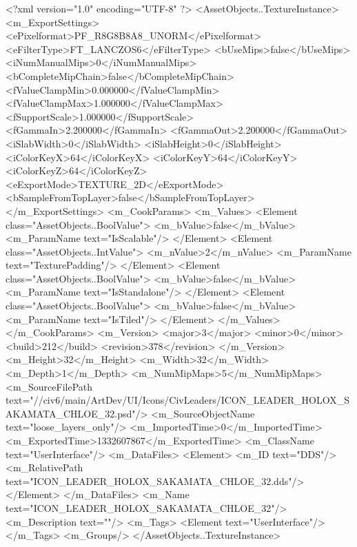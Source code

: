 <?xml version="1.0" encoding="UTF-8" ?>
<AssetObjects..TextureInstance>
	<m_ExportSettings>
		<ePixelformat>PF_R8G8B8A8_UNORM</ePixelformat>
		<eFilterType>FT_LANCZOS6</eFilterType>
		<bUseMips>false</bUseMips>
		<iNumManualMips>0</iNumManualMips>
		<bCompleteMipChain>false</bCompleteMipChain>
		<fValueClampMin>0.000000</fValueClampMin>
		<fValueClampMax>1.000000</fValueClampMax>
		<fSupportScale>1.000000</fSupportScale>
		<fGammaIn>2.200000</fGammaIn>
		<fGammaOut>2.200000</fGammaOut>
		<iSlabWidth>0</iSlabWidth>
		<iSlabHeight>0</iSlabHeight>
		<iColorKeyX>64</iColorKeyX>
		<iColorKeyY>64</iColorKeyY>
		<iColorKeyZ>64</iColorKeyZ>
		<eExportMode>TEXTURE_2D</eExportMode>
		<bSampleFromTopLayer>false</bSampleFromTopLayer>
	</m_ExportSettings>
	<m_CookParams>
		<m_Values>
			<Element class="AssetObjects..BoolValue">
				<m_bValue>false</m_bValue>
				<m_ParamName text="IsScalable"/>
			</Element>
			<Element class="AssetObjects..IntValue">
				<m_nValue>2</m_nValue>
				<m_ParamName text="TexturePadding"/>
			</Element>
			<Element class="AssetObjects..BoolValue">
				<m_bValue>false</m_bValue>
				<m_ParamName text="IsStandalone"/>
			</Element>
			<Element class="AssetObjects..BoolValue">
				<m_bValue>false</m_bValue>
				<m_ParamName text="IsTiled"/>
			</Element>
		</m_Values>
	</m_CookParams>
	<m_Version>
		<major>3</major>
		<minor>0</minor>
		<build>212</build>
		<revision>378</revision>
	</m_Version>
	<m_Height>32</m_Height>
	<m_Width>32</m_Width>
	<m_Depth>1</m_Depth>
	<m_NumMipMaps>5</m_NumMipMaps>
	<m_SourceFilePath text="//civ6/main/ArtDev/UI/Icons/CivLeaders/ICON_LEADER_HOLOX_SAKAMATA_CHLOE_32.psd"/>
	<m_SourceObjectName text="loose_layers_only"/>
	<m_ImportedTime>0</m_ImportedTime>
	<m_ExportedTime>1332607867</m_ExportedTime>
	<m_ClassName text="UserInterface"/>
	<m_DataFiles>
		<Element>
			<m_ID text="DDS"/>
			<m_RelativePath text="ICON_LEADER_HOLOX_SAKAMATA_CHLOE_32.dds"/>
		</Element>
	</m_DataFiles>
	<m_Name text="ICON_LEADER_HOLOX_SAKAMATA_CHLOE_32"/>
	<m_Description text=""/>
	<m_Tags>
		<Element text="UserInterface"/>
	</m_Tags>
	<m_Groups/>
</AssetObjects..TextureInstance>

